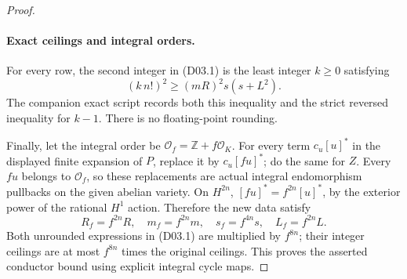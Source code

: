 \begin{proof}
\paragraph{Exact ceilings and integral orders.}
For every row, the second integer in (D03.1) is the least
integer \(k\ge0\) satisfying
\[
 (k\,n!)^2\ge(mR)^2s(s+L^2).
\]
The companion exact script records both this inequality and the
strict reversed inequality for \(k-1\). There is no floating-point
rounding.

Finally, let the integral order be
\(\mathcal O_f=\mathbb Z+f\mathcal O_K\).
For every term \(c_u[u]^*\) in the displayed finite expansion
of \(P\), replace it by \(c_u[fu]^*\); do the same for \(Z\).
Every \(fu\) belongs to \(\mathcal O_f\), so these replacements
are actual integral endomorphism pullbacks on the given abelian
variety. On \(H^{2n}\),
\([fu]^*=f^{2n}[u]^*\), by the exterior power of the rational
\(H^1\) action. Therefore the new data satisfy
\[
 R_f=f^{2n}R,\quad m_f=f^{2n}m,\quad
 s_f=f^{4n}s,\quad L_f=f^{2n}L.
\]
Both unrounded expressions in (D03.1) are multiplied by
\(f^{8n}\); their integer ceilings are at most \(f^{8n}\)
times the original ceilings. This proves the asserted conductor
bound using explicit integral cycle maps.
\end{proof}

